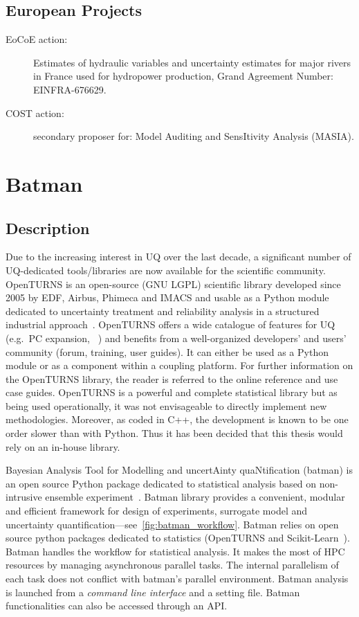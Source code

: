 \section*{European Projects}

\begin{description}
\item[EoCoE action:] Estimates of hydraulic variables and uncertainty estimates for major rivers in France used for hydropower production, Grand Agreement Number: EINFRA-676629.
\item[COST action:] secondary proposer for: Model Auditing and SensItivity Analysis (MASIA).
\end{description}


\chapter{Batman}\label{chap:batman}

\section{Description}

Due to the increasing interest in UQ over the last decade, a significant number of UQ-dedicated tools/libraries are now available for the scientific community. OpenTURNS is an open-source (GNU LGPL) scientific library developed since 2005 by EDF, Airbus, Phimeca and IMACS and usable as a Python module dedicated to uncertainty treatment and reliability analysis in a structured industrial approach~\citep{baudin2015}. OpenTURNS offers a wide catalogue of features for UQ (e.g.~PC expansion, \citeauthor{dutka2009}~\citeyear{dutka2009}) and benefits from a well-organized developers' and users' community (forum, training, user guides). It can either be used as a Python module or as a component within a coupling platform. For further information on the OpenTURNS library, the reader is referred to the online reference and use case guides. OpenTURNS is a powerful and complete statistical library but as being used operationally, it was not envisageable to directly implement new methodologies. Moreover, as coded in C++, the development is known to be one order slower than with Python. Thus it has been decided that this thesis would rely on an in-house library.

Bayesian Analysis Tool for Modelling and uncertAinty quaNtification (batman) is an open source Python package dedicated to statistical analysis based on non-intrusive ensemble experiment~\cite{roy2018}. Batman library provides a convenient, modular and efficient framework for design of experiments, surrogate model and uncertainty quantification---see~\cref{fig:batman_workflow}. Batman relies on open source python packages dedicated to statistics (OpenTURNS and Scikit-Learn~\citep{pedregosa2011}). Batman handles the workflow for statistical analysis. It makes the most of HPC resources by managing asynchronous parallel tasks. The internal parallelism of each task does not conflict with batman's parallel environment. Batman analysis is launched from a \emph{command line interface} and a setting file. Batman functionalities can also be accessed through an API.

